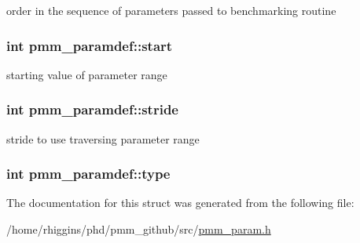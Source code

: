 order in the sequence of parameters passed to benchmarking routine \hypertarget{structpmm__paramdef_a832e0696b11902af685bca8e8ca99c57}{
\subsubsection[{start}]{\setlength{\rightskip}{0pt plus 5cm}int pmm\-\_\-paramdef\-::start}}\label{structpmm__paramdef_a832e0696b11902af685bca8e8ca99c57}
starting value of parameter range \hypertarget{structpmm__paramdef_aa6d5577edc2faf9df52ffbcd5c8cce67}{
\subsubsection[{stride}]{\setlength{\rightskip}{0pt plus 5cm}int pmm\-\_\-paramdef\-::stride}}\label{structpmm__paramdef_aa6d5577edc2faf9df52ffbcd5c8cce67}
stride to use traversing parameter range \hypertarget{structpmm__paramdef_a9574b1c9c8b8fdf6fbaec045f11c9b09}{
\subsubsection[{type}]{\setlength{\rightskip}{0pt plus 5cm}int pmm\-\_\-paramdef\-::type}}\label{structpmm__paramdef_a9574b1c9c8b8fdf6fbaec045f11c9b09}


The documentation for this struct was generated from the following file\-:\begin{DoxyCompactItemize}
\item 
/home/rhiggins/phd/pmm\-\_\-github/src/\hyperlink{pmm__param_8h}{pmm\-\_\-param.\-h}\end{DoxyCompactItemize}

